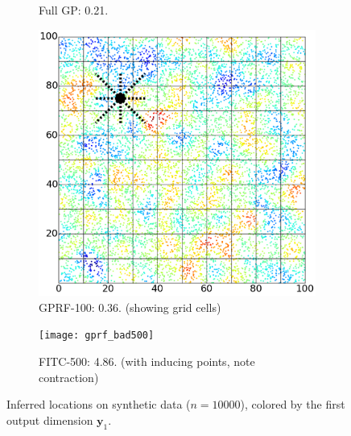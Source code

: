 \documentclass{article}
\renewcommand{\v}[1]{\mathbf{#1}}
\begin{document}
\begin{figure}
\begin{subfigure}[t]{.21\textwidth}
        \caption{Full GP: 0.21.}
        \label{fig:synth_exact} 
    \end{subfigure}\hspace{0.5em}
\begin{subfigure}[t]{.215\textwidth}
        \includegraphics[width=\textwidth]{synth_grid_edges}
        \caption{GPRF-100: 0.36. (showing grid cells)}
        \label{fig:synth_gprf} 
    \end{subfigure}\hspace{0.5em}
\begin{subfigure}[t]{.21\textwidth}
        \centering
        \texttt{[image: gprf\_bad500]}
        \caption{FITC-500: 4.86. (with inducing points, note contraction)}
        \label{fig:synth_fitc500} 
\end{subfigure}
\caption{Inferred locations on synthetic data
  ($n=10000$), colored by the first output dimension $\v{y}_1$. }
\label{fig:synth_data}

\end{figure}

\end{document}
